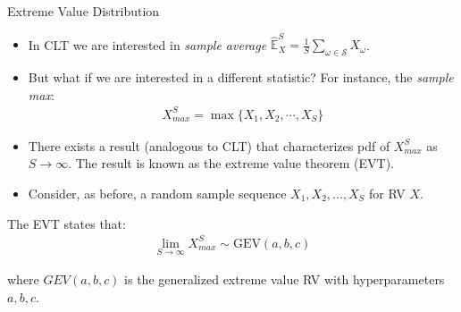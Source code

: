 \documentclass[9pt]{beamer}
\begin{document}
%
\begin{frame}{Extreme Value Distribution}

\begin{itemize}
\item In CLT we are interested in {\em sample average} $\hat{\mathbb{E}}_X^S=\frac{1}{S}\sum_{\omega\in \mathcal{S}}X_\omega$. 

\item But what if we are interested in a different statistic? For instance, the {\em sample max}:
\begin{align*}
X_{max}^S=\max\{X_1,X_2,\cdots, X_S\}
\end{align*}

\item There exists a result (analogous to CLT) that characterizes pdf of $X_{max}^S$ as $S\to \infty$.  The result is known as the extreme value theorem (EVT).

\item Consider, as before, a random sample sequence $X_1,X_2,...,X_S$ for RV $X$. 

\end{itemize}

\begin{block}{}
The EVT states that:
\begin{align*}
\lim_{S\to \infty}X_{max}^S\sim \textrm{GEV}(a,b,c)
\end{align*}
\end{block}
where $GEV(a,b,c)$ is the generalized extreme value RV with hyperparameters $a,b,c$. 

\end{frame}
\end{document}
